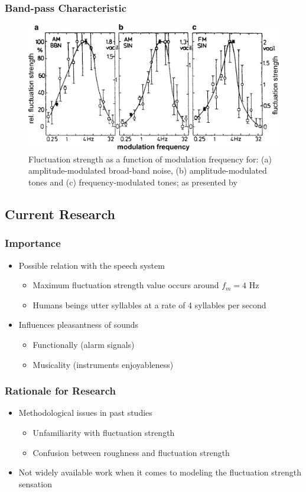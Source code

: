 \documentclass{beamer}
\begin{document}
\begin{frame}
  \frametitle{Band-pass Characteristic}
  \begin{figure}
    \includegraphics[width=\textwidth]{fs_vs_md}
    \caption{Fluctuation strength as a function of modulation frequency for: (a)
      amplitude-modulated broad-band noise, (b) amplitude-modulated tones and
      (c) frequency-modulated tones; as presented by
      \citet{Fastl2007Psychoacoustics}}
  \end{figure}
\end{frame}

\subsection{Current Research}
\begin{frame}
  \frametitle{Importance}
  \begin{itemize}
    \item Possible relation with the speech system
    \begin{itemize}
      \item Maximum fluctuation strength value occurs around $f_m = 4$ Hz
      \item Humans beings utter syllables at a rate of 4 syllables per second
    \end{itemize}
    \item Influences pleasantness of sounds
    \begin{itemize}
      \item Functionally (alarm signals)
      \item Musicality (instruments enjoyableness)
    \end{itemize}
  \end{itemize}
\end{frame}

\begin{frame}
  \frametitle{Rationale for Research}
  \begin{itemize}
    \item Methodological issues in past studies
    \begin{itemize}
      \item Unfamiliarity with fluctuation strength
      \item Confusion between roughness and fluctuation strength
    \end{itemize}
    \item Not widely available work when it comes to modeling the fluctuation
      strength sensation
  \end{itemize}
\end{frame}
\end{document}
